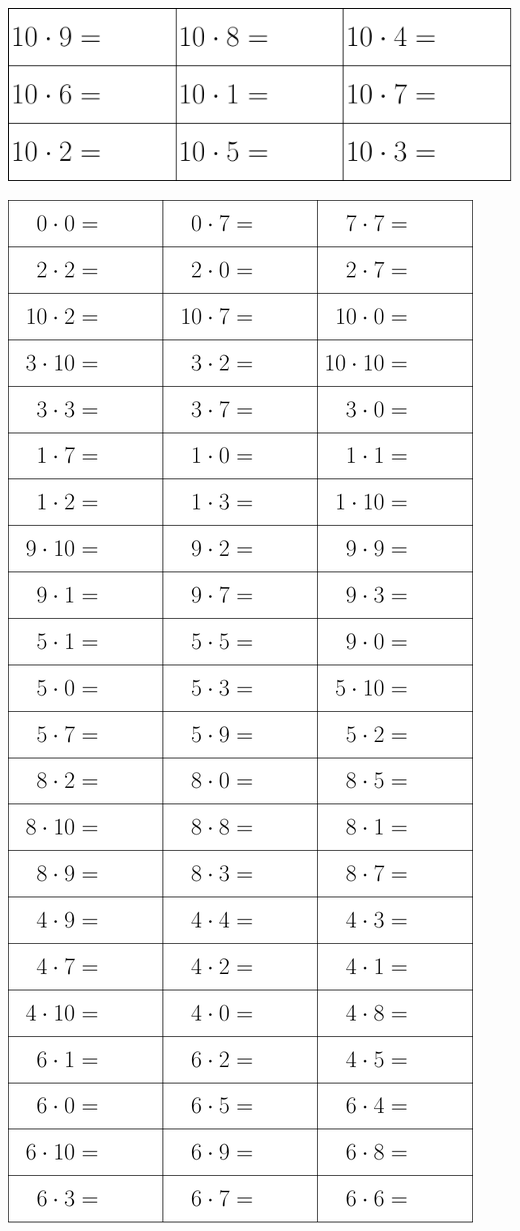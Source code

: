 \vspace{10pt}
\begin{center}
	\includegraphics{g10}
\end{center}
\newpage
\thispagestyle{empty}
\begin{center}
	\includegraphics{0-10}
\end{center}
